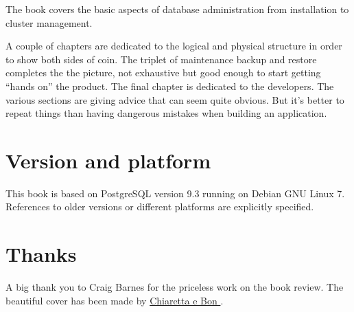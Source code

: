 \documentclass[oneside]{book}
\begin{document}
The book covers the basic aspects of database administration from installation
to cluster management.\newline

A couple of chapters are dedicated to the logical and physical structure in
order to show both sides of coin.  The triplet of maintenance backup and restore completes the 
the picture, not exhaustive but good enough to start getting ``hands on'' the product.
The final chapter is dedicated to the developers. The various sections are 
giving advice that can seem quite obvious. But it's better to repeat things than having dangerous 
mistakes when building an application. 

\chapter*{Version and platform}
This book is based on PostgreSQL version 9.3 running on Debian GNU Linux 7.
References to older versions or different platforms are explicitly specified.

\chapter*{Thanks}
A big thank you to Craig Barnes for the priceless work on the book review.\newline
The beautiful cover has been made by \href{http://www.bonland.eu/}{
Chiaretta e Bon }.\newline

\tableofcontents{}













\appendix



\listoffigures
\listoftables
\printindex{}
\end{document}
